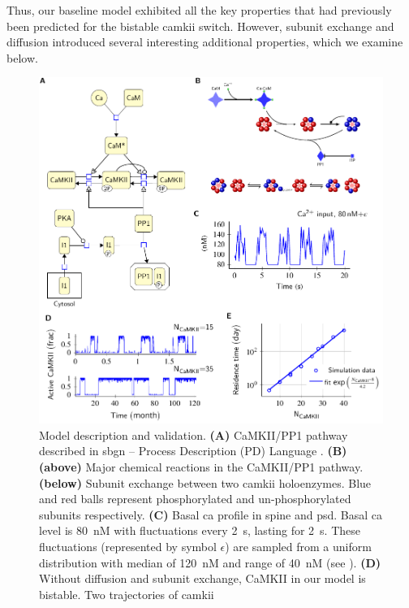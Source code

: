 \documentclass[9pt,lineno,doublespacing]{elife}
\begin{document}
Thus, our baseline model exhibited all the key properties that had
previously been predicted for the bistable \gls{camkii} switch. However, 
subunit exchange and diffusion introduced several interesting additional
properties, which we examine below.

\begin{figure}[t]%
    \includegraphics[width=0.95\linewidth]{./PaperFigures/elifeFigure1/figure_validation_178mm.pdf}
    \caption{Model description and validation. \textbf{(A)} CaMKII/PP1 pathway
        described in \gls{sbgn} -- Process Description (PD) Language
        \citep{novere_systems_2009}. \textbf{(B)} \textbf{(above)} Major
        chemical reactions in the CaMKII/PP1 pathway. \textbf{(below)} Subunit
        exchange between two \gls{camkii} holoenzymes. Blue and red balls
        represent phosphorylated and un-phosphorylated subunits respectively.
        \textbf{(C)} Basal \gls{ca} profile in spine and \gls{psd}. Basal
        \gls{ca} level is \SI{80}{\nano M} with fluctuations every
        \SI{2}{\second}, lasting for \SI{2}{\second}. These fluctuations
        (represented by symbol $\epsilon$) are sampled from a uniform distribution with median of
        \SI{120}{\nano M} and range of \SI{40}{\nano M} (see
        ). \textbf{(D)} Without diffusion and subunit exchange,
        CaMKII in our model is bistable. Two trajectories of \gls{camkii}
}
\end{figure}
\end{document}
